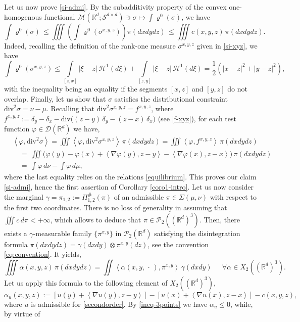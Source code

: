 \documentclass[11pt,letterpaper,reqno]{amsart}
\theoremstyle{definition}
\numberwithin{equation}{section}
\def\f{\varphi}
\newcommand{\R}{\mathbb{R}}
\newcommand{\argu}{{\,\cdot\,}}
\newcommand{\Mes}{{\mathcal{M}}}
\newcommand{\dive}{{\mathrm{div}}}
\newcommand{\PP}{\mathcal{P}}
\newcommand{\pairing}[1]{{\left \langle #1 \right \rangle}}
\newcommand{\abs}[1]{{\left \lvert #1 \right \rvert}}
\newcommand{\D}{\mathcal{D}}
\newcommand{\Ha}{\mathcal{H}}
\newcommand{\Sdd}{{\mathcal{S}^{d \times d}}}
\begin{document}
{Let us now prove \eqref{si-admi}. By  the subadditivity property of the convex one-homogenous functional
$\Mes(\R^d;\Sdd) \ni \sigma\mapsto \int \varrho^0(\sigma)$, we have
$$  \int \varrho^0(\sigma) \, \le \iiint \left(\int \varrho^0(\sigma^{x,y,z})\right) \pi(dxdydz) \,
\le \iiint c(x,y,z)\, \pi(dxdydz) .$$
Indeed, recalling the definition of the rank-one measure $\sigma^{x,y,z}$ given in \eqref{si-xyz}, we have
$$   \int \varrho^0(\sigma^{x,y,z}) \le  \int\limits_{[z,x]} \!\abs{\xi-z}\, \Ha^1(d\xi) + \int\limits_{[z,y]} \!\abs{\xi-z}\, \Ha^1(d\xi) 
= \frac1{2} (|x-z|^2 + |y-z|^2),  $$
with the inequality being an equality if the  segments $[x,z]$ and $ [y,z]$ do not overlap.
Finally, let us show  that $\sigma$ satisfies the distributional constraint $\dive^2 \sigma= \nu-\mu$. 
Recalling that $ \dive^2 \sigma^{x,y,z} =f^{x,y,z}$, where $f^{x,y,z}:= \delta_y - \delta_x - \dive\big((z-y)\,\delta_y - (z-x)\,\delta_x \big)$ (see \eqref{f-xyz}), for each test function $\f\in \D(\R^d)$ we have,
\begin{align*} &\pairing{\f,\dive^2 \sigma} =  \iiint\pairing{\f,\dive^2 \sigma^{x,y,z}} \, \pi(dxdydz) = 
 \iiint\pairing{\f, f^{x,y,z}} \, \pi(dxdydz)\\
&\quad= \ \iiint \Big(\f(y)-\f(x) + \pairing{\nabla\f(y),z-y} - \pairing{\nabla\f(x),z-x}   \Big) \, \pi(dxdydz) \\
&\quad= \ \int \f \, d\nu - \int \f\, d\mu  ,   
\end{align*} 
where the last equality relies on the relations \eqref{equilibrium}.
This proves our claim \eqref{si-admi}, hence the first assertion of Corollary \ref{coro1-intro}. 
Let us now consider the marginal $\gamma= \pi_{1,2}:=\Pi_{1,2}^\#(\pi) $ of an admissible $\pi\in \Sigma(\mu,\nu)$ with respect to the first two coordinates.
There is no loss of generality in assuming that  $\iiint c\, d\pi <+\infty$, which allows to deduce that $\pi\in  \PP_2((\R^d)^3)$.
Then, there exists a $\gamma$-measurable family $\{{\pi^{x,y}}\}$ in $\PP_2(\R^d)$ satisfying the disintegration formula $\pi(dxdydz) = \gamma(dxdy) \otimes \pi^{x,y}(dz)$, see the convention \eqref{eq:convention}. It yields,
$$\iiint \alpha(x,y,z) \, \pi(dxdydz) = \iint \pairing {\alpha(x,y,\argu),{\pi^{x,y}}} \, \gamma(dxdy) \quad \ \ \forall \alpha\in X_2((\R^d)^3) .$$
Let us apply this formula to the following element of $X_2((\R^d)^3)$,
$$\alpha_u (x,y,z) := \left[u(y) + \pairing{\nabla u(y), z-y}\right]-  \left[u(x) + \pairing{\nabla u(x), z-x}\right]  - c(x,y,z)
 ,$$
where $u$ is admissible for \eqref{secondorder}. By \eqref{ineq-3points} we have $\alpha_u \le 0$, while, by virtue of 
}
\end{document}

